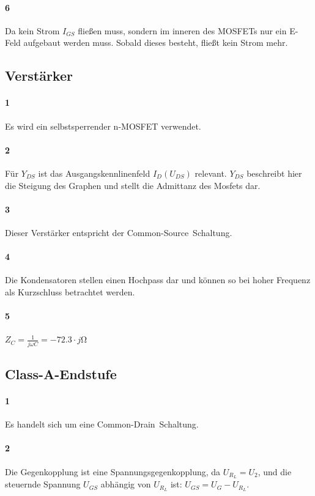 \documentclass[a4paper]{article}
\newcommand{\ugs}{U_{GS}}
\newcommand{\uds}{U_{DS}}
\begin{document}
\paragraph{6}
Da kein Strom $I_{GS}$ fließen muss, sondern im inneren des MOSFETs nur ein E-Feld aufgebaut werden muss. Sobald dieses besteht, fließt kein Strom mehr.

\subsection{Verstärker}
\paragraph{1}
Es wird ein selbstsperrender n-MOSFET verwendet.

\paragraph{2}
Für $Y_{DS}$ ist das Ausgangskennlinenfeld $I_D(\uds)$ relevant. $Y_{DS}$ beschreibt hier die Steigung des Graphen und stellt die Admittanz des Mosfets dar.

\paragraph{3}
Dieser Verstärker entspricht der \glqq Common-Source\grqq\ Schaltung.

\paragraph{4}
Die Kondensatoren stellen einen Hochpass dar und können so bei hoher Frequenz als Kurzschluss betrachtet werden.

\paragraph{5}
$Z_C=\frac{1}{j\omega C}=-72.3\cdot j \si{\ohm}$

\subsection{Class-A-Endstufe}
\paragraph{1}
Es handelt sich um eine \glqq Common-Drain\grqq\ Schaltung.

\paragraph{2}
Die Gegenkopplung ist eine Spannungsgegenkopplung, da $U_{R_L}=U_2$, und die steuernde Spannung $\ugs$ abhängig von $U_{R_L}$ ist: $\ugs = U_G - U_{R_L}$.
\end{document}
